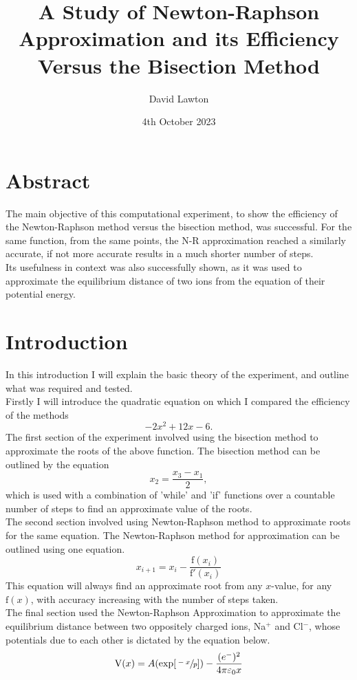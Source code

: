 \documentclass{article}
\title{A Study of Newton-Raphson Approximation and its Efficiency Versus the Bisection Method}
\author{David Lawton }
\date{4th October 2023}
\begin{document}
\maketitle
\vfill
\tableofcontents

\newpage
\section{Abstract}
The main objective of this computational experiment, to show the efficiency of the Newton-Raphson method versus the bisection method, was successful. For the same function, from the same points, the N-R approximation reached a similarly accurate, if not more accurate results in a much shorter number of steps.\\
\indent Its usefulness in context was also successfully shown, as it was used to approximate the equilibrium distance of two ions from the equation of their potential energy.
\section{Introduction}
In this introduction I will explain the basic theory of the experiment, and outline what was required and tested.\\
\indent Firstly I will introduce the quadratic equation on which I compared the efficiency of the methods %
\begin{equation}
\label{eq:quadf}
    -2x^2 + 12x - 6 \mathrm{.}
\end{equation}
\indent The first section of the experiment involved using the bisection method to approximate the roots of the above function. The bisection method can be outlined by the equation %
\begin{equation}
	\label{eq:bisect}
    x_2 = \frac{x_3-x_1}{2} \mathrm{,}
\end{equation}
which is used with a combination of 'while' and 'if' functions over a countable number of steps to find an approximate value of the roots.\\
\indent The second section involved using Newton-Raphson method to approximate roots for the same equation. The Newton-Raphson method for approximation can be outlined using one equation.\\
\begin{equation}
	\label{eq:NRapprox}
    x_{i+1} = x_i - \frac{\mathrm{f}(x_i)}{\mathrm{f}'(x_i)}
\end{equation}
This equation will always find an approximate root from any $x$-value, for any $\mathrm{f}(x)$, with accuracy increasing with the number of steps taken.\\
The final section used the Newton-Raphson Approximation to approximate the equilibrium distance between two oppositely charged ions, Na$^+$ and Cl$^-$, whose potentials due to each other is dictated by the equation below.
\begin{equation}
	\label{eq:V(x)acc}
	\mathrm{V}(x) = A(\mathrm{exp}[\sfrac{-x}{p}]) - \frac{(e^-)^2}{4\pi\varepsilon_0x}
\end{equation}
\end{document}
